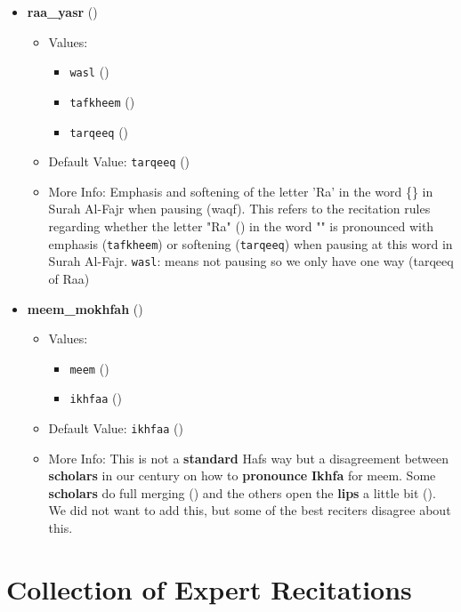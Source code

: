 \begin{itemize}
\item \textbf{raa\_yasr} ()
  \begin{itemize}
  \item Values: 
    \begin{itemize}
    \item  \texttt{wasl} ()
    \item  \texttt{tafkheem} ()
    \item  \texttt{tarqeeq} ()
    \end{itemize}
  \item Default Value: \texttt{tarqeeq} ()
  \item More Info: Emphasis and softening of the letter 'Ra' in the word \{\} in Surah Al-Fajr when pausing (waqf). This refers to the recitation rules regarding whether the letter "Ra" () in the word "" is pronounced with emphasis (\texttt{tafkheem}) or softening (\texttt{tarqeeq}) when pausing at this word in Surah Al-Fajr. \texttt{wasl}: means not pausing so we only have one way (tarqeeq of Raa)
  \end{itemize}

\item \textbf{meem\_mokhfah} ()
  \begin{itemize}
  \item Values: 
    \begin{itemize}
    \item  \texttt{meem} ()
    \item  \texttt{ikhfaa} ()
    \end{itemize}
  \item Default Value: \texttt{ikhfaa} ()
  \item More Info: This is not a \textbf{standard} Hafs way but a disagreement between \textbf{scholars} in our century on how to \textbf{pronounce} \textbf{Ikhfa} for meem. Some \textbf{scholars} do full merging () and the others open the \textbf{lips} a little bit (). We did not want to add this, but some of the best reciters disagree about this.
  \end{itemize}
\end{itemize}



\section{Collection of Expert Recitations}


